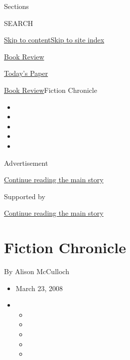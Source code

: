 Sections

SEARCH

\protect\hyperlink{site-content}{Skip to
content}\protect\hyperlink{site-index}{Skip to site index}

\href{https://www.nytimes3xbfgragh.onion/section/books/review}{Book
Review}

\href{https://myaccount.nytimes3xbfgragh.onion/auth/login?response_type=cookie\&client_id=vi}{}

\href{https://www.nytimes3xbfgragh.onion/section/todayspaper}{Today's
Paper}

\href{/section/books/review}{Book Review}\textbar{}Fiction Chronicle

\begin{itemize}
\item
\item
\item
\item
\item
\end{itemize}

Advertisement

\protect\hyperlink{after-top}{Continue reading the main story}

Supported by

\protect\hyperlink{after-sponsor}{Continue reading the main story}

\hypertarget{fiction-chronicle}{%
\section{Fiction Chronicle}\label{fiction-chronicle}}

By Alison McCulloch

\begin{itemize}
\item
  March 23, 2008
\item
  \begin{itemize}
  \item
  \item
  \item
  \item
  \item
  \end{itemize}
\end{itemize}

